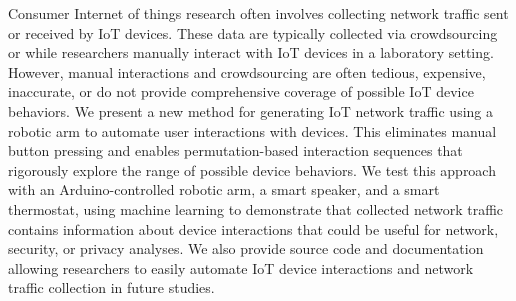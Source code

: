 Consumer Internet of things research often involves collecting network traffic sent or received by IoT devices. These data are typically collected via crowdsourcing or while researchers manually interact with IoT devices in a laboratory setting. However, manual interactions and crowdsourcing are often tedious, expensive, inaccurate, or do not provide comprehensive coverage of possible IoT device behaviors. 
We present a new method for generating IoT network traffic using a robotic arm to automate user interactions with devices. 
This eliminates manual button pressing and enables permutation-based interaction sequences that rigorously explore the range of possible device behaviors.
We test this approach with an Arduino-controlled robotic arm, a smart speaker, and a smart thermostat, using machine learning to demonstrate that collected network traffic contains information about device interactions that could be useful for network, security, or privacy analyses.
We also provide source code and documentation allowing researchers to easily automate IoT device interactions and network traffic collection in future studies. 
